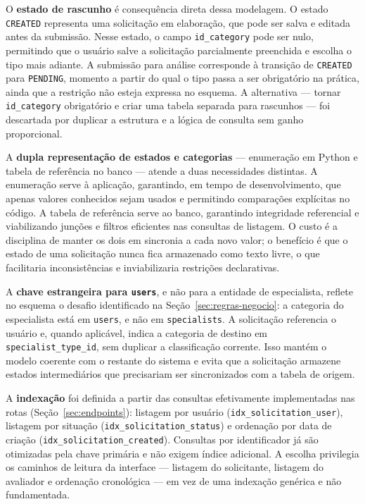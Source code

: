 O \textbf{estado de rascunho} é consequência direta dessa modelagem. O 
estado \texttt{CREATED} representa uma solicitação em elaboração, que pode 
ser salva e editada antes da submissão. Nesse estado, o campo 
\texttt{id\_category} pode ser nulo, permitindo que o usuário salve a 
solicitação parcialmente preenchida e escolha o tipo mais adiante. A 
submissão para análise corresponde à transição de \texttt{CREATED} para 
\texttt{PENDING}, momento a partir do qual o tipo passa a ser obrigatório 
na prática, ainda que a restrição não esteja expressa no esquema. A 
alternativa — tornar \texttt{id\_category} obrigatório e criar uma tabela 
separada para rascunhos — foi descartada por duplicar a estrutura e a 
lógica de consulta sem ganho proporcional.

A \textbf{dupla representação de estados e categorias} — enumeração em 
Python e tabela de referência no banco — atende a duas necessidades 
distintas. A enumeração serve à aplicação, garantindo, em tempo de 
desenvolvimento, que apenas valores conhecidos sejam usados e permitindo 
comparações explícitas no código. A tabela de referência serve ao banco, 
garantindo integridade referencial e viabilizando junções e filtros 
eficientes nas consultas de listagem. O custo é a disciplina de manter os 
dois em sincronia a cada novo valor; o benefício é que o estado de uma 
solicitação nunca fica armazenado como texto livre, o que facilitaria 
inconsistências e inviabilizaria restrições declarativas.

A \textbf{chave estrangeira para \texttt{users}}, e não para a entidade de 
especialista, reflete no esquema o desafio identificado na 
Seção~\ref{sec:regras-negocio}: a categoria do especialista está em 
\texttt{users}, e não em \texttt{specialists}. A solicitação referencia 
o usuário e, quando aplicável, indica a categoria de destino em 
\texttt{specialist\_type\_id}, sem duplicar a classificação corrente. Isso 
mantém o modelo coerente com o restante do sistema e evita que a 
solicitação armazene estados intermediários que precisariam ser 
sincronizados com a tabela de origem.

A \textbf{indexação} foi definida a partir das consultas efetivamente 
implementadas nas rotas (Seção~\ref{sec:endpoints}): listagem por usuário 
(\texttt{idx\_solicitation\_user}), listagem por situação 
(\texttt{idx\_solicitation\_status}) e ordenação por data de criação 
(\texttt{idx\_solicitation\_created}). Consultas por identificador já são 
otimizadas pela chave primária e não exigem índice adicional. A escolha 
privilegia os caminhos de leitura da interface — listagem do solicitante, 
listagem do avaliador e ordenação cronológica — em vez de uma indexação 
genérica e não fundamentada.

